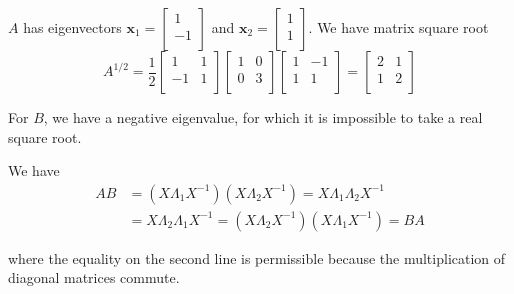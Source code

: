 \documentclass[a4paper]{article}
\begin{document}
\(A\) has eigenvectors \(\bm{x}_{1} = 
\begin{bmatrix}
	1 \\
	-1 \\
\end{bmatrix}\) and \(\bm{x}_{2} = 
\begin{bmatrix}
	1 \\
	1 \\
\end{bmatrix}\). We have matrix square root
\[
	A^{1/2} = \frac{1}{2}
	\begin{bmatrix}
		1 & 1 \\
		-1 & 1 \\
	\end{bmatrix}
	\begin{bmatrix}
		1 & 0 \\
		0 & 3 \\
	\end{bmatrix}
	\begin{bmatrix}
		1 & -1 \\
		1 & 1 \\
	\end{bmatrix} =
	\begin{bmatrix}
		2 & 1 \\
		1 & 2 \\
	\end{bmatrix}
\]

For \(B\), we have a negative eigenvalue, for which it is impossible to take a real square root.

\vspace{12pt}


We have
\begin{align*}
	AB & = \!\left( X \Lambda_{1} X^{-1} \right) \!\left( X \Lambda_{2} X^{-1} \right) = X \Lambda_{1} \Lambda_{2} X^{-1}  \\
	   & = X \Lambda_{2} \Lambda_{1} X^{-1} = \!\left( X \Lambda_{2} X^{-1} \right) \!\left( X \Lambda_{1} X^{-1} \right) = BA
\end{align*}

where the equality on the second line is permissible because the multiplication of diagonal matrices commute.

\vspace{12pt}
\end{document}
